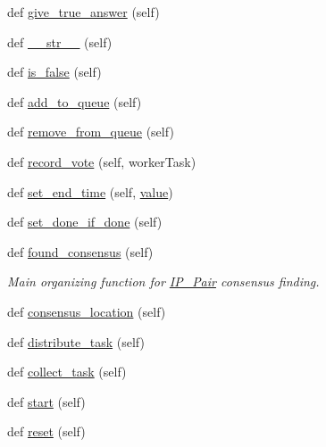 \begin{DoxyCompactItemize}
def \mbox{\hyperlink{classdynamicfilterapp_1_1models_1_1_i_p___pair_a13fca2f105fb534c24f1cfb2abb2c85a}{give\+\_\+true\+\_\+answer}} (self)
\item 
def \mbox{\hyperlink{classdynamicfilterapp_1_1models_1_1_i_p___pair_a23e8041ce1015febe4fdace3225714f9}{\+\_\+\+\_\+str\+\_\+\+\_\+}} (self)
\item 
def \mbox{\hyperlink{classdynamicfilterapp_1_1models_1_1_i_p___pair_a9ea3f5304734ea61cc64bb827a640601}{is\+\_\+false}} (self)
\item 
def \mbox{\hyperlink{classdynamicfilterapp_1_1models_1_1_i_p___pair_ac83cd255885b9a7b8852cd66fad6da53}{add\+\_\+to\+\_\+queue}} (self)
\item 
def \mbox{\hyperlink{classdynamicfilterapp_1_1models_1_1_i_p___pair_a438b59c52d810e87114f98c1996d6272}{remove\+\_\+from\+\_\+queue}} (self)
\item 
def \mbox{\hyperlink{classdynamicfilterapp_1_1models_1_1_i_p___pair_ad5b3eb8ce467b3f59a854be3fd0d10f1}{record\+\_\+vote}} (self, worker\+Task)
\item 
def \mbox{\hyperlink{classdynamicfilterapp_1_1models_1_1_i_p___pair_a162297e8bb5e9091aa3236a770e28004}{set\+\_\+end\+\_\+time}} (self, \mbox{\hyperlink{classdynamicfilterapp_1_1models_1_1_i_p___pair_afcc7a4b78ecd8fa7e713f8cfa0f51017}{value}})
\item 
def \mbox{\hyperlink{classdynamicfilterapp_1_1models_1_1_i_p___pair_a5facdfe9e351f3e0ea3126454b41f2b9}{set\+\_\+done\+\_\+if\+\_\+done}} (self)
\item 
def \mbox{\hyperlink{classdynamicfilterapp_1_1models_1_1_i_p___pair_a9b963fe3640eebb2f1fe833cb906a13d}{found\+\_\+consensus}} (self)
\begin{DoxyCompactList}\small\item\em Main organizing function for \mbox{\hyperlink{classdynamicfilterapp_1_1models_1_1_i_p___pair}{I\+P\+\_\+\+Pair}} consensus finding. \end{DoxyCompactList}\item 
def \mbox{\hyperlink{classdynamicfilterapp_1_1models_1_1_i_p___pair_a9a807d3f1cbfc022e836d62ee6b71477}{consensus\+\_\+location}} (self)
\item 
def \mbox{\hyperlink{classdynamicfilterapp_1_1models_1_1_i_p___pair_a2222560950a1e6f6b3a67c30d802c16e}{distribute\+\_\+task}} (self)
\item 
def \mbox{\hyperlink{classdynamicfilterapp_1_1models_1_1_i_p___pair_a7fcdd3e1ce91010e08372a2160f1ce42}{collect\+\_\+task}} (self)
\item 
def \mbox{\hyperlink{classdynamicfilterapp_1_1models_1_1_i_p___pair_af1af6ddf04f00f958949618f79c33b82}{start}} (self)
\item 
def \mbox{\hyperlink{classdynamicfilterapp_1_1models_1_1_i_p___pair_a51829b63adb24ac48d350dee60181002}{reset}} (self)
\end{DoxyCompactItemize}
